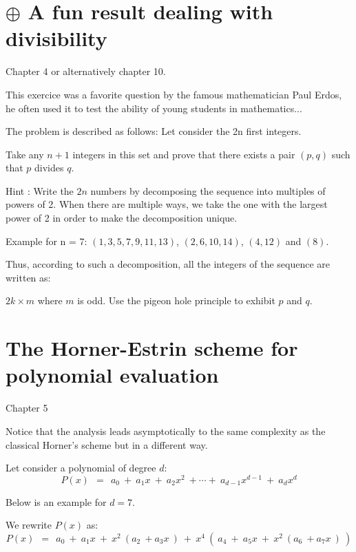 \documentclass{article}[12pt]
\begin{document}
\section{$\oplus$ A fun result dealing with divisibility}

Chapter 4 or alternatively chapter 10.

This exercice was a favorite question by the famous mathematician Paul Erdos, 
he often used it to test the ability of young students in mathematics...

The problem is described as follows: Let consider the 2n first integers.

Take any $n+1$ integers in this set and prove that there exists a pair $(p,q)$ such that $p$ divides $q$.
\smallskip

Hint : Write the $2n$ numbers by decomposing the sequence into multiples of powers of 2. 
When there are multiple ways, we take the one with the largest power of 2 in order to make the decomposition unique. 

Example for n = 7:
$(1, 3, 5, 7, 9, 11, 13)$, 
$(2, 6, 10, 14)$,
$(4, 12)$ and $(8)$.

Thus, according to such a decomposition, all the integers of the sequence are written as: 

$2k \times m$ where $m$ is odd.
Use the pigeon hole principle to exhibit $p$ and $q$.


\section{The Horner-Estrin scheme for polynomial evaluation}

Chapter 5

Notice that the analysis leads asymptotically to the same complexity as the classical Horner's scheme but in a different way.
\bigskip

Let consider a polynomial of degree $d$:
\[
P(x) \ \ = \ \ a_0 \ + \ a_1 x \ + \ a_2 x^2 \ + \cdots + \ a_{d-1} x^{d-1} \ + \ a_d x^d
\]

Below is an example for $d=7$.

We rewrite $P(x)$ as:
\[
P(x) \ \ = \ \ a_0 \ + \ a_1 x \ + \ x^2 \ ( a_2  \ + a_3 x \ ) \ + 
\ x^4 \ ( \ a_4 \ + \ a_5 x \ + \ x^2 \ ( a_6  \ + a_7 x \ ) \ )
\]

%
\end{document}
